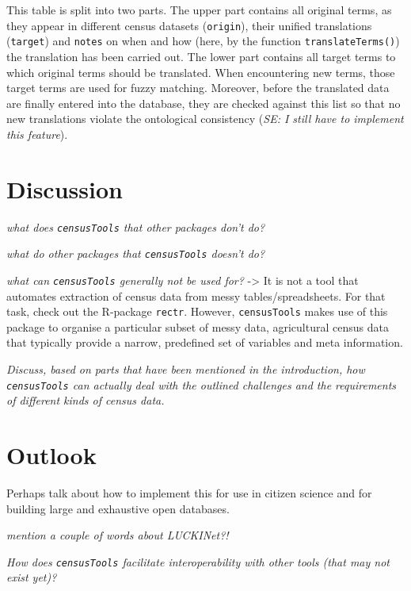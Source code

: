 \documentclass[12pt,]{article}
\begin{document}
This table is split into two parts. The upper part contains all original terms, as they appear in different census datasets (\texttt{origin}), their unified translations (\texttt{target}) and \texttt{notes} on when and how (here, by the function \texttt{translateTerms()}) the translation has been carried out.
The lower part contains all target terms to which original terms should be translated. When encountering new terms, those target terms are used for fuzzy matching.
Moreover, before the translated data are finally entered into the database, they are checked against this list so that no new translations violate the ontological consistency (\emph{SE: I still have to implement this feature}).

\hypertarget{discussion}{%
\section{Discussion}\label{discussion}}

\emph{what does \texttt{censusTools} that other packages don't do?}

\emph{what do other packages that \texttt{censusTools} doesn't do?}

\emph{what can \texttt{censusTools} generally not be used for?} -\textgreater{} It is not a tool that automates extraction of census data from messy tables/spreadsheets. For that task, check out the R-package \texttt{rectr}. However, \texttt{censusTools} makes use of this package to organise a particular subset of messy data, agricultural census data that typically provide a narrow, predefined set of variables and meta information.

\emph{Discuss, based on parts that have been mentioned in the introduction, how \texttt{censusTools} can actually deal with the outlined challenges and the requirements of different kinds of census data.}

\hypertarget{outlook}{%
\section{Outlook}\label{outlook}}

Perhaps talk about how to implement this for use in citizen science and for building large and exhaustive open databases.

\emph{mention a couple of words about LUCKINet?!}

\emph{How does \texttt{censusTools} facilitate interoperability with other tools (that may not exist yet)?}
\end{document}

